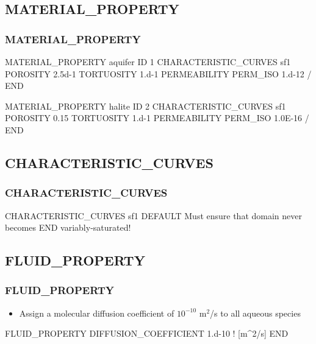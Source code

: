 \documentclass{beamer}
\newcommand\bluecomment[1]{{{\color{blue} #1}}}
\begin{document}
\subsection{MATERIAL\_PROPERTY}

\begin{frame}\frametitle{MATERIAL\_PROPERTY}

\small
\begin{semiverbatim}
MATERIAL_PROPERTY aquifer
  ID 1
  CHARACTERISTIC_CURVES sf1
  POROSITY  2.5d-1
  TORTUOSITY 1.d-1
  PERMEABILITY
    PERM_ISO 1.d-12
  /
END

MATERIAL_PROPERTY halite
  ID 2
  CHARACTERISTIC_CURVES sf1
  POROSITY  0.15
  TORTUOSITY 1.d-1
  PERMEABILITY
    PERM_ISO 1.0E-16
  /
END
\end{semiverbatim}

\end{frame}

\subsection{CHARACTERISTIC\_CURVES}

\begin{frame}[fragile]\frametitle{CHARACTERISTIC\_CURVES}

\begin{semiverbatim}
CHARACTERISTIC_CURVES sf1
  DEFAULT  \bluecomment{Must ensure that domain never becomes }
END          \bluecomment{variably-saturated!}
\end{semiverbatim}

\end{frame}

\subsection{FLUID\_PROPERTY}

\begin{frame}\frametitle{FLUID\_PROPERTY}

\begin{itemize}
  \item Assign a molecular diffusion coefficient of $10^{-10}$ m$^2$/s to all aqueous species
\end{itemize}

\begin{semiverbatim}

FLUID_PROPERTY
  DIFFUSION_COEFFICIENT 1.d-10   \bluecomment{! [m^2/s]}
END
\end{semiverbatim}

\end{frame}
\end{document}
